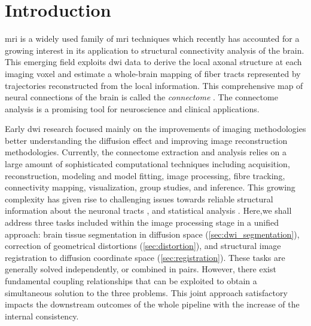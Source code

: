 \section{Introduction}
\label{sec:introduction}
% 
% 
% 
% 
%
 \gls{mri} is a widely used family
of \gls{mri} techniques \citep{sundgren_diffusion_2004} which recently 
has accounted for a growing interest in its application to structural 
connectivity analysis of the brain. This emerging field exploits
\gls{dwi} data to derive the local axonal structure at each imaging voxel 
\citep{basser_microstructural_2011} and estimate a whole-brain mapping of fiber 
tracts represented by trajectories reconstructed from the local information.
This comprehensive map of neural connections of the brain is called the 
\emph{connectome} \citep{hagmann_diffusion_2005,sporns_human_2005}. The connectome
analysis is a promising tool for neuroscience and clinical applications.


Early \gls{dwi} research focused mainly on the improvements of imaging 
methodologies better understanding the diffusion effect and improving
image reconstruction methodologies. Currently, the connectome extraction 
and analysis relies on a large amount of sophisticated computational techniques
\citep{daducci_connectome_2012,hagmann_mr_2012} including acquisition,
reconstruction, modeling and model fitting, image processing, fibre tracking,
connectivity mapping, visualization, group studies, and inference. This 
growing complexity has given rise to challenging issues towards reliable 
structural information about the neuronal tracts \cite{johansen-berg_using_2009,
jones_white_2012,soares_hitchhikers_2013}, and statistical analysis 
\citep{meskaldji_comparing_????}. Here,we shall address three tasks included within 
the image processing stage in a unified approach: brain tissue segmentation in 
diffusion space (\autoref{sec:dwi_segmentation}), correction of geometrical 
distortions (\autoref{sec:distortion}), and structural image registration to 
diffusion coordinate space (\autoref{sec:registration}). These tasks are generally
solved independently, or combined in pairs. However, there exist fundamental 
coupling relationships that can be exploited to obtain a simultaneous solution to 
the three problems. This joint approach satisfactory impacts the downstream
outcomes of the whole pipeline with the increase of the internal consistency.

